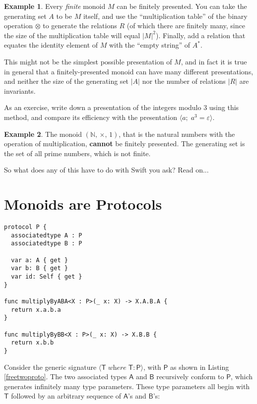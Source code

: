 \documentclass[a4paper,headsepline,bibliography=totoc,toc=flat,fleqn,twoside=semi]{scrbook}
\theoremstyle{definition}
\theoremstyle{definition}
\newtheorem{example}{Example}[chapter]
\theoremstyle{definition}
\newcommand{\namesym}[1]{\mathsf{#1}}
\newcommand{\genericparam}[1]{\bm{\mathsf{#1}}}
\newcommand{\proto}[1]{\bm{\mathsf{#1}}}
\newcommand{\gensig}[2]{\langle #1\;\textit{where}\;#2\rangle}
\begin{document}
\begin{example} Every \emph{finite} monoid $M$ can be finitely presented. You can take the generating set $A$ to be $M$ itself, and use the ``multiplication table'' of the binary operation $\otimes$ to generate the relations $R$ (of which there are finitely many, since the size of the multiplication table will equal $|M|^2$). Finally, add a relation that equates the identity element of $M$ with the ``empty string'' of $A^*$.

This might not be the simplest possible presentation of $M$, and in fact it is true in general that a finitely-presented monoid can have many different presentations, and neither the size of the generating set $|A|$ nor the number of relations $|R|$ are invariants.

As an exercise, write down a presentation of the integers modulo 3 using this method, and compare its efficiency with the presentation $\langle a;\;a^3=\varepsilon\rangle$.
\end{example}

\begin{example} The monoid $(\mathbb{N},\,\times,\,1)$, that is the natural numbers with the operation of multiplication, \textbf{cannot} be finitely presented. The generating set is the set of all prime numbers, which is not finite.
\end{example}

So what does any of this have to do with Swift you ask? Read on...

\chapter{Monoids are Protocols}\label{monoidsasprotocols}
\begin{listing}\label{freetwoproto}
\begin{Verbatim}
protocol P {
  associatedtype A : P
  associatedtype B : P

  var a: A { get }
  var b: B { get }
  var id: Self { get }
}

func multiplyByABA<X : P>(_ x: X) -> X.A.B.A {
  return x.a.b.a
}

func multiplyByBB<X : P>(_ x: X) -> X.B.B {
  return x.b.b
}
\end{Verbatim}
\end{listing}

Consider the generic signature $\gensig{\genericparam{T}}{\genericparam{T}\colon\proto{P}}$, with $\proto{P}$ as shown in Listing \ref{freetwoproto}. The two associated types $\namesym{A}$ and $\namesym{B}$ recursively conform to $\proto{P}$, which generates infinitely many type parameters. These type parameters all begin with $\genericparam{T}$ followed by an arbitrary sequence of $\namesym{A}$'s and $\namesym{B}$'s:
\end{document}
